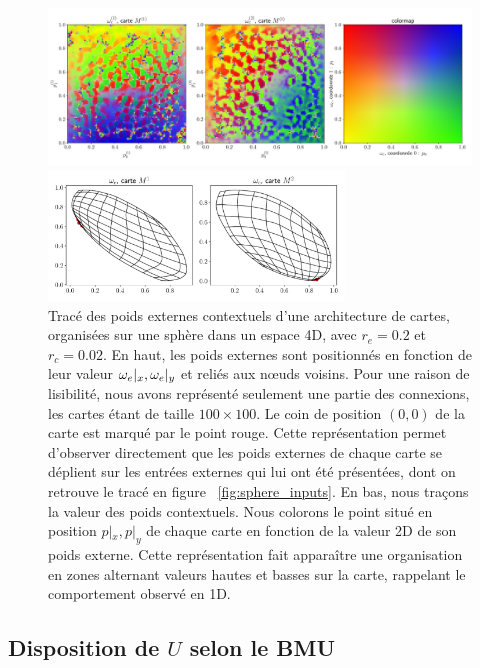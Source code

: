 \documentclass[../main]{subfiles}
\begin{document}
\begin{figure}[ht!]
	\begin{minipage}{\textwidth}
	\includegraphics[width=\textwidth]{wc_rc002_afterbug_nopoints.pdf}
	\end{minipage}
	\begin{minipage}{\textwidth}
		\includegraphics[width=0.7\textwidth]{we_rc002_afterbug_step10.pdf}
		\caption{Tracé des poids externes contextuels d'une architecture de cartes, organisées sur une sphère dans un espace 4D, avec $r_e =0.2$ et $r_c = 0.02$.
		En haut, les poids externes sont positionnés en fonction de leur valeur $\omega_e|_x, \omega_e|_y$ et reliés aux n\oe{}uds voisins. Pour une raison de lisibilité, nous avons représenté seulement une partie des connexions, les cartes étant de taille $100 \times 100$. Le coin de position $(0,0)$ de la carte est marqué par le point rouge. Cette représentation permet d'observer directement que les poids externes de chaque carte se déplient sur les entrées externes qui lui ont été présentées, dont on retrouve le tracé en figure ~\ref{fig:sphere_inputs}.
		En bas, nous traçons la valeur des poids contextuels. Nous colorons le point situé en position $p|_x, p|_y$ de chaque carte en fonction de la valeur 2D de son poids externe. Cette représentation fait apparaître une organisation en zones alternant valeurs hautes et basses sur la carte, rappelant le comportement observé en 1D.
		\label{fig:2som_s_002_wc}}
		\end{minipage}
\end{figure}

\subsection{Disposition de $U$ selon le BMU \label{par:U_bmu2D}}
\end{document}
